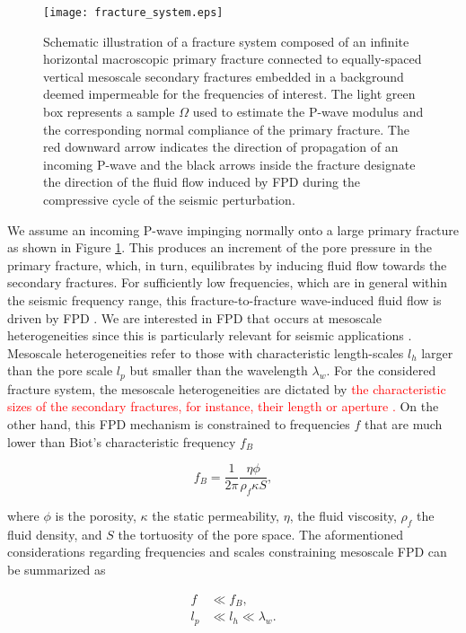 \documentclass[draft]{agujournal2019}
\newcommand{\red}{\textcolor{red}}
\begin{document}
 \begin{figure}[!ht]
\centering
        \texttt{[image: fracture\_system.eps]}
\caption{Schematic illustration of a fracture system composed of an infinite horizontal macroscopic primary fracture connected to equally-spaced vertical mesoscale secondary fractures embedded in a background deemed impermeable for the frequencies of interest. The light green box represents a sample $\Omega$ used to estimate the P-wave modulus and the corresponding normal compliance of the primary fracture. The red downward arrow indicates the direction of propagation of an incoming P-wave and the black arrows inside the fracture designate the direction of the fluid flow induced by FPD during the compressive cycle of the seismic perturbation.
}
\label{fig.1}
\end{figure}

We assume an incoming P-wave impinging normally onto a large primary fracture as shown  in Figure \ref{fig.1}. This produces an increment of the pore pressure in the primary fracture, which, in turn, equilibrates by inducing fluid flow towards the secondary fractures. For sufficiently low frequencies, which are in general within the seismic frequency range, this fracture-to-fracture wave-induced fluid flow is driven by FPD \cite{Muller2010}.
We are interested in FPD that occurs at mesoscale heterogeneities since this is particularly relevant for seismic applications \cite{Pride2004, Muller2010}.
Mesoscale heterogeneities refer to those with characteristic length-scales  $l_h$ larger than the pore scale $l_p$ but smaller than the wavelength $\lambda_w$. For the considered fracture system, the mesoscale heterogeneities are dictated by
\red{
the characteristic sizes of the secondary fractures, for instance, their  length  or aperture \cite{Rubino2014}.
}
On the other hand, this FPD  mechanism is constrained to frequencies $f$ that are much lower than Biot's characteristic frequency $f_B$  \cite{Biot1956, Dutta1979}
\begin{linenomath*}
\begin{equation}\label{Eq.1}
f_B= \frac{1}{2 \pi} \frac{\eta \phi}{ \rho_f \kappa S },
\end{equation}
\end{linenomath*}
where $\phi$ is the porosity, $\kappa$  the static permeability, $\eta$, the fluid viscosity,  $\rho_f$ the fluid density, and $S$ the tortuosity of the pore space. The aformentioned considerations regarding frequencies and scales constraining mesoscale FPD can be summarized as
\begin{linenomath*}
\begin{equation}\label{Eq.2}
\begin{split}
f & \ll f_B,\\
l_p & \ll l_h\ll \lambda_w.
\end{split}
\end{equation}
\end{linenomath*}
\end{document}
